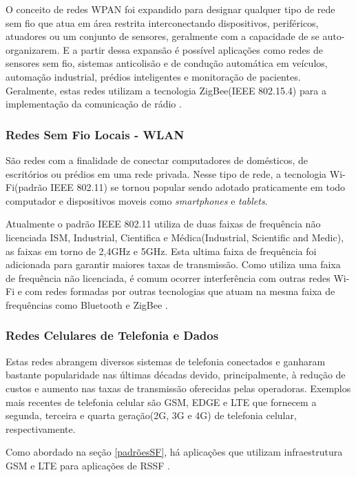 O conceito de redes WPAN foi expandido para designar qualquer tipo de rede sem fio que atua em área restrita interconectando dispositivos, periféricos, atuadores ou um conjunto de sensores, geralmente com a capacidade de se auto-organizarem. E a partir dessa expansão é possível aplicações como redes de sensores sem fio, sistemas anticolisão e de condução automática em veículos, automação industrial, prédios inteligentes e monitoração de pacientes. Geralmente, estas redes utilizam a tecnologia ZigBee(IEEE 802.15.4) para a implementação da comunicação de rádio \cite{rochol2018sistemas}.

\subsubsection*{Redes Sem Fio Locais - WLAN}
São redes com a finalidade de conectar computadores de domésticos, de escritórios ou prédios em uma rede privada. Nesse tipo de rede, a tecnologia Wi-Fi(padrão IEEE 802.11) se tornou popular sendo adotado praticamente em todo computador e dispositivos moveis como \emph{smartphones} e \emph{tablets}.

Atualmente o padrão IEEE 802.11 utiliza de duas faixas de frequência não licenciada ISM, Industrial, Cientifica e Médica(Industrial, Scientific and Medic), as faixas em torno de 2,4GHz e 5GHz. Esta ultima faixa de frequência foi adicionada para garantir maiores taxas de transmissão. Como utiliza uma faixa de frequência não licenciada, é comum ocorrer interferência com outras redes Wi-Fi e com redes formadas por outras tecnologias que atuam na mesma faixa de frequências como Bluetooth e ZigBee \cite{rochol2018sistemas}.

\subsubsection*{Redes Celulares de Telefonia e Dados}
Estas redes abrangem diversos sistemas de telefonia conectados e ganharam bastante popularidade nas últimas décadas devido, principalmente, à redução de custos e aumento nas taxas de transmissão oferecidas pelas operadoras. Exemplos mais recentes de telefonia celular são GSM, EDGE e LTE que fornecem a segunda, terceira e quarta geração(2G, 3G e 4G) de telefonia celular, respectivamente.

Como abordado na seção \ref{padrõesSF}, há aplicações que utilizam infraestrutura GSM e LTE para aplicações de RSSF \cite{rochol2018sistemas}.


